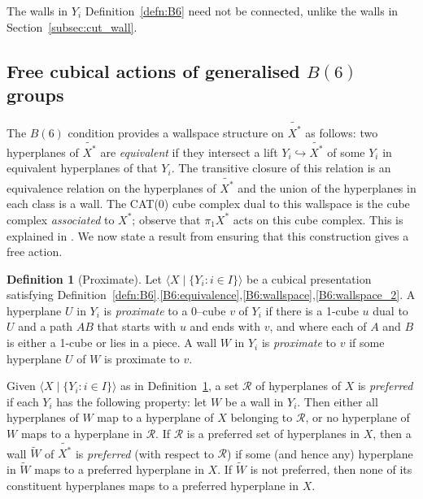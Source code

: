 \documentclass[11pt,oneside]{amsart}
\theoremstyle{definition}
\newtheorem{defn}[thm]{Definition}
\begin{document}
The walls in $Y_i$ Definition~\ref{defn:B6} need not be connected, unlike the walls in Section~\ref{subsec:cut_wall}.  

\subsection{Free cubical actions of generalised $B(6)$ groups}\label{subsec:cubulating-small-cancelllation}
The $B(6)$ condition provides a wallspace structure on $\widetilde{X^*}$ as follows: two hyperplanes of $\widetilde{X^*}$ are \emph{equivalent} if they intersect a lift $Y_i\hookrightarrow \widetilde{X^*}$ of some $Y_i$ in equivalent hyperplanes of that $Y_i$.  The transitive closure of this relation is an equivalence relation on the hyperplanes of $\widetilde{X^*}$ and the union of the hyperplanes in each class is a wall.  The CAT(0) cube complex dual to this wallspace is the cube complex \emph{associated} to $X^*$; observe that $\pi_1X^*$ acts on this cube complex.  This is explained in \cite[Sec. 5]{Wise:QCH}.  We now state a result from \cite{Wise:QCH} ensuring that this construction gives a free action.

\begin{defn}[Proximate]\label{defn:proximate}
Let $\langle X\mid\{Y_i:i\in I\}\rangle$ be a cubical presentation satisfying 
Definition~\ref{defn:B6}.\eqref{B6:equivalence},\eqref{B6:wallspace},\eqref{B6:wallspace_2}.  A hyperplane $U$ in 
$Y_i$ is \emph{proximate} to a $0$--cube $v$ of $Y_i$ if 
there is a 1-cube $u$ dual to $U$ and a path $AB$ that starts with $u$ and ends with $v$,
and where each of $A$ and $B$ is either a 1-cube or lies in a piece.  A wall $W$ in $Y_i$ is \emph{proximate} 
to $v$ if some hyperplane $U$ of $W$ is proximate to $v$.
\end{defn}

Given $\langle X\mid\{Y_i:i\in I\}\rangle$ as in Definition~\ref{defn:proximate}, a set $\mathcal R$ of hyperplanes 
of $X$ is \emph{preferred} if each $Y_i$ has the following property: let $W$ be a wall in $Y_i$.  Then either all 
hyperplanes of $W$ map to a hyperplane of $X$ belonging to $\mathcal R$, or no hyperplane of $W$ maps to a 
hyperplane in $\mathcal R$.  If $\mathcal R$ is a preferred set of hyperplanes in $X$, then a wall $\widetilde W$ of 
$\widetilde{X^*}$ is \emph{preferred} (with respect to $\mathcal R$) if some (and hence any) hyperplane in 
$\widetilde W$ maps to a preferred hyperplane in $X$.  If $\widetilde W$ is not preferred, then none of its 
constituent hyperplanes maps to a preferred hyperplane in $X$.
\end{document}
